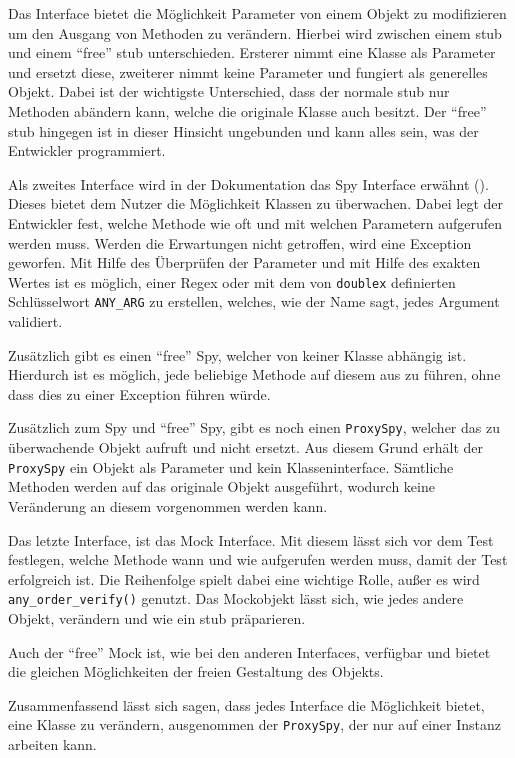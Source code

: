 Das Interface bietet die Möglichkeit Parameter von einem Objekt zu modifizieren
um den Ausgang von Methoden zu verändern. Hierbei wird zwischen einem \Gls{stub}
und einem "`free"' \Gls{stub} unterschieden. Ersterer nimmt eine Klasse als
Parameter und ersetzt diese, zweiterer nimmt keine Parameter und fungiert als
generelles Objekt. Dabei ist der wichtigste Unterschied, dass der normale
\Gls{stub} nur Methoden abändern kann, welche die originale Klasse auch 
besitzt. Der "`free"' \Gls{stub} hingegen ist in dieser Hinsicht ungebunden und 
kann alles sein, was der Entwickler programmiert.

Als zweites Interface wird in der Dokumentation das Spy Interface erwähnt
(\cite{doublex:docs:1.8.1}). Dieses bietet dem Nutzer die Möglichkeit Klassen zu
überwachen. Dabei legt der Entwickler fest, welche Methode wie oft und mit
welchen Parametern aufgerufen werden muss. Werden die Erwartungen nicht
getroffen, wird eine Exception geworfen. Mit Hilfe des Überprüfen der Parameter 
und mit Hilfe des exakten Wertes ist es möglich, einer Regex oder mit dem von
\lstinline{doublex} definierten Schlüsselwort \lstinline{ANY_ARG} zu erstellen, 
welches, wie der Name sagt, jedes Argument validiert.

Zusätzlich gibt es einen "`free"' Spy, welcher von keiner
Klasse abhängig ist. Hierdurch ist es möglich, jede beliebige Methode auf
diesem aus zu führen, ohne dass dies zu einer Exception führen würde.

Zusätzlich zum Spy und "`free"' Spy, gibt es noch einen \lstinline{ProxySpy},
welcher das zu überwachende Objekt aufruft und nicht ersetzt. Aus diesem Grund
erhält der \lstinline{ProxySpy} ein Objekt als Parameter und kein
Klasseninterface. Sämtliche Methoden werden auf das originale Objekt ausgeführt,
wodurch keine Veränderung an diesem vorgenommen werden kann.

Das letzte Interface, ist das Mock Interface. Mit diesem lässt sich vor dem Test
festlegen, welche Methode wann und wie aufgerufen werden muss, damit der Test
erfolgreich ist. Die Reihenfolge spielt dabei eine wichtige Rolle, außer es wird
\lstinline{any_order_verify()} genutzt. Das Mockobjekt lässt sich, wie
jedes andere Objekt, verändern und wie ein \Gls{stub} präparieren.

Auch der "`free"' Mock ist, wie bei den anderen Interfaces, verfügbar und bietet
die gleichen Möglichkeiten der freien Gestaltung des Objekts.

Zusammenfassend lässt sich sagen, dass jedes Interface die Möglichkeit bietet, 
eine
Klasse zu verändern, ausgenommen der \lstinline{ProxySpy}, der nur auf einer
Instanz arbeiten kann.

